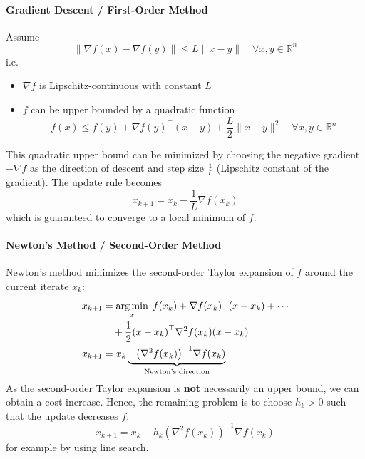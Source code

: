 \paragraph{Gradient Descent / First-Order Method}
Assume
\begin{equation*}
    \|\nabla f(x) - \nabla f(y)\| \leq L \|x - y\| \quad \forall x, y \in \mathbb{R}^n
\end{equation*}
i.e.\
\begin{itemize}
    \item $\nabla f$ is Lipschitz-continuous with constant $L$
    \item $f$ can be upper bounded by a quadratic function
          \begin{equation*}
              f(x) \leq f(y) + \nabla {f(y)}^\top (x - y) + \frac{L}{2} \|x - y\|^2 \quad \forall x, y \in \mathbb{R}^n
          \end{equation*}
\end{itemize}
\newpar{}
This quadratic upper bound can be minimized by choosing the negative gradient $-\nabla f$ as the direction of descent and step size $\frac{1}{L}$ (Lipschitz constant of the gradient). The update rule becomes
\begin{equation*}
    x_{k+1} = x_k - \frac{1}{L} \nabla f(x_k)
\end{equation*}
which is guaranteed to converge to a local minimum of $f$.

\paragraph{Newton's Method / Second-Order Method}
Newton's method minimizes the second-order Taylor expansion of $f$ around the current iterate $x_k$:
\begin{align*}
    x_{k+1} & = \operatorname*{arg\,min}_{x} \; f(x_k) + \nabla {f(x_k)}^\top (x-x_k) + \cdots                                      \\
            & \quad + \frac{1}{2}{(x-x_k)}^\top \nabla^2 f(x_k)(x-x_k)                                             \\
    x_{k+1} & = x_k \underbrace{- {\left( \nabla^2 f(x_k) \right)}^{-1} \nabla f(x_k)}_{\text{Newton's direction}}
\end{align*}
As the second-order Taylor expansion is \textbf{not} necessarily an upper bound, we can obtain a cost increase. Hence, the remaining problem is to choose $h_k > 0$ such that the update decreases $f$:
\begin{equation*}
    x_{k+1} = x_k - h_k {\left( \nabla^2 f(x_k) \right)}^{-1} \nabla f(x_k)
\end{equation*}
for example by using line search.

